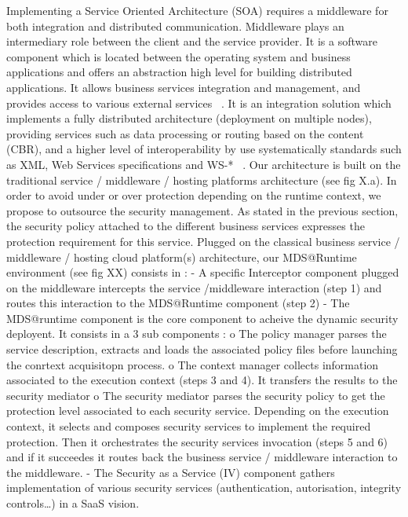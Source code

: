 \documentclass[runningheads,a4paper]{llncs}
\begin{document}
Implementing a Service Oriented Architecture (SOA) requires a middleware for both integration and distributed communication. Middleware plays an intermediary role between the client and the service provider. It is a software component which is located between the operating system and business applications and offers an abstraction high level for building distributed applications. It allows business services integration and management, and provides access to various external services ~\cite{SHLP05}. It is an integration solution which implements a fully distributed architecture (deployment on multiple nodes), providing services such as data processing or routing based on the content (CBR), and a higher level of interoperability by use systematically standards such as XML, Web Services specifications and WS-* ~\cite{Lou08}.
Our architecture is built on the traditional service / middleware / hosting platforms architecture (see fig X.a). In order to avoid under or over protection depending on the runtime context, we propose to outsource the security management. As stated in the previous section, the security policy attached to the different business services expresses the protection requirement for this service. Plugged on the classical business service / middleware / hosting cloud platform(s) architecture, our MDS@Runtime environment (see fig XX) consists in :
-	A specific Interceptor component plugged on the middleware intercepts the service /middleware interaction (step 1) and routes this interaction to the MDS@Runtime component (step 2)
-	The MDS@runtime component  is the core component to acheive the dynamic security deployent. It consists in a 3 sub components : 
	o	The policy manager parses the service description, extracts and loads the associated policy files before launching the conrtext acquisitopn process.
	o	 The context manager collects information associated to the execution context (steps 3 and 4). It transfers the results to the security mediator
	o	The security mediator parses the security policy to get the protection level associated to each security service. Depending on the execution context, it selects and composes security services to implement the required protection. Then it orchestrates the security services invocation (steps 5 and 6) and if it succeedes it routes back the business service / middleware interaction to the middleware.
-	The Security as a Service (IV) component gathers implementation of various security services (authentication, autorisation, integrity controls…) in a SaaS vision.
 
\end{document}
